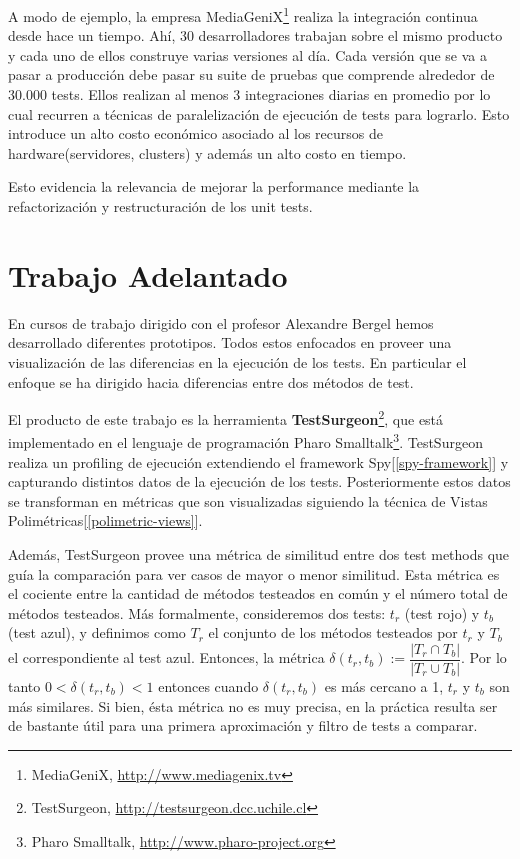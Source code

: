 \documentclass[12pt,spanish,letterpaper]{article}
\begin{document}
\par A modo de ejemplo, la empresa MediaGeniX\footnote{MediaGeniX, \url{http://www.mediagenix.tv}} realiza la integración continua desde hace un tiempo. Ahí, 30 desarrolladores trabajan sobre el mismo producto y cada uno de ellos construye varias versiones al día. Cada versión que se va a pasar a producción debe pasar su suite de pruebas que comprende alrededor de 30.000 tests. Ellos realizan al menos 3 integraciones diarias en promedio por lo cual recurren a técnicas de paralelización de ejecución de tests para lograrlo. Esto introduce un alto costo económico asociado al los recursos de hardware(servidores, clusters) y además un alto costo en tiempo.\\

\par Esto evidencia la relevancia de mejorar la performance mediante la refactorización y restructuración de los unit tests.



\section{Trabajo Adelantado}
\par En cursos de trabajo dirigido con el profesor Alexandre Bergel hemos desarrollado diferentes prototipos. Todos estos enfocados en proveer una visualización de las diferencias en la ejecución de los tests. En particular el enfoque se ha dirigido hacia diferencias entre dos métodos de test. \\

\par El producto de este trabajo es la herramienta \textbf{TestSurgeon}\footnote{TestSurgeon, \url{http://testsurgeon.dcc.uchile.cl}}, que está implementado en el lenguaje de programación Pharo Smalltalk\footnote{Pharo Smalltalk, \url{http://www.pharo-project.org}}. TestSurgeon realiza un profiling de ejecución extendiendo el framework Spy[\ref{spy-framework}] y capturando  distintos datos de la ejecución de los tests. Posteriormente estos datos se transforman en métricas que son visualizadas siguiendo la técnica de Vistas Polimétricas[\ref{polimetric-views}]. \\

\par Además, TestSurgeon provee una métrica de similitud entre dos test methods que guía la comparación para ver casos de mayor o menor similitud. Esta métrica es el cociente entre la cantidad de métodos testeados en común y el número total de métodos testeados. Más formalmente, consideremos dos tests: $t_r$ (test rojo) y $t_b$ (test azul), y definimos como $T_r$ el conjunto de los métodos testeados por $t_r$ y $T_b$ el correspondiente al test azul. Entonces, la métrica $\delta(t_r,t_b) := \dfrac{\vert T_r \cap T_b \vert}{\vert T_r \cup T_b \vert}$. Por lo tanto $0 < \delta(t_r,t_b) < 1$ entonces cuando $\delta(t_r,t_b)$ es más cercano a 1, $t_r$ y $t_b$ son más similares.  Si bien, ésta métrica no es muy precisa, en la práctica resulta ser de bastante útil para una primera aproximación y filtro de tests a comparar.\\
\end{document}
